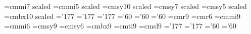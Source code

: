 \font\absis=cmmi7 scaled \font\absiss=cmmi5 scaled
\font\abssy=cmsy10 scaled \font\abssys=cmsy7 scaled
\font\abssyss=cmsy5 scaled \font\absbf=cmbx10 scaled
\skewchar\absi='177 \skewchar\absis='177 \skewchar\absiss='177
\skewchar\abssy='60 \skewchar\abssys='60 \skewchar\abssyss='60
%
\def\abstractfont{\def\rm{\fam0\absrm}%
\textfont0=\absrm \scriptfont0=\absrms \scriptscriptfont0=\absrmss
\textfont1=\absi \scriptfont1=\absis \scriptscriptfont1=\absiss
\textfont2=\abssy \scriptfont2=\abssys \scriptscriptfont2=\abssyss
\textfont\itfam=\absit \def\it{\fam\itfam\absit}\def\footnotefont{\tenpoint}%
\textfont\slfam=\abssl \def\sl{\fam\slfam\abssl}%
\textfont\bffam=\absbf \def\bf{\fam\bffam\absbf}\rm}\fi
%
\def\tenpoint{\def\rm{\fam0\tenrm}%
\textfont0=\tenrm \scriptfont0=\sevenrm \scriptscriptfont0=\fiverm
\textfont1=\teni  \scriptfont1=\seveni  \scriptscriptfont1=\fivei
\textfont2=\tensy \scriptfont2=\sevensy \scriptscriptfont2=\fivesy
\textfont\itfam=\tenit \def\it{\fam\itfam\tenit}\def\footnotefont{\ninepoint}%
\textfont\bffam=\tenbf \def\bf{\fam\bffam\tenbf}\def\sl{\fam\slfam\tensl}\rm}
%
\font\ninerm=cmr9 \font\sixrm=cmr6 \font\ninei=cmmi9 \font\sixi=cmmi6
\font\ninesy=cmsy9 \font\sixsy=cmsy6 \font\ninebf=cmbx9
\font\nineit=cmti9 \font\ninesl=cmsl9 \skewchar\ninei='177
\skewchar\sixi='177 \skewchar\ninesy='60 \skewchar\sixsy='60
%
\def\ninepoint{\def\rm{\fam0\ninerm}%
\textfont0=\ninerm \scriptfont0=\sixrm \scriptscriptfont0=\fiverm
\textfont1=\ninei \scriptfont1=\sixi \scriptscriptfont1=\fivei
\textfont2=\ninesy \scriptfont2=\sixsy \scriptscriptfont2=\fivesy
\textfont\itfam=\ninei \def\it{\fam\itfam\nineit}\def\sl{\fam\slfam\ninesl}%
\textfont\bffam=\ninebf \def\bf{\fam\bffam\ninebf}\rm}
%
%
\def\noblackbox{\overfullrule=0pt}
%
\def\inv{^{\raise.15ex\hbox{${\scriptscriptstyle -}$}\kern-.05em 1}}
\def\dup{^{\vphantom{1}}}
\def\Dsl{\,\raise.15ex\hbox{/}\mkern-13.5mu D} %
\def\dsl{\raise.15ex\hbox{/}\kern-.57em\partial}
\def\del{\partial}
\def\Psl{\dsl}
\def\tr{{\rm tr}} \def\Tr{{\rm Tr}}
\def\biglie{\font\bigit=cmti10 scaled\magstep1\hbox{\bigit\$}} %
\def\lspace{\ifx\answ\bigans{}\else\qquad\fi}
\def\lbspace{\ifx\answ\bigans{}\else\hskip-.2in\fi} %
\def\boxeqn#1{\vcenter{\vbox{\hrule\hbox{\vrule\kern3pt\vbox{\kern3pt
	\hbox{${\displaystyle #1}$}\kern3pt}\kern3pt\vrule}\hrule}}}
